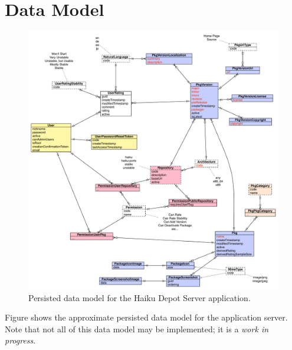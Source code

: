
\section{Data Model}

\begin{figure}
\centering
\vspace{.2in}
\includegraphics[width=6.5in]{img-datamodel.pdf}
\caption{Persisted data model for the Haiku Depot Server application.}
\label{\thefigure}
\end{figure}

Figure {\thefigure} shows the approximate persisted data model for the application server.  Note that not all of this data model may be implemented; it is a {\it work in progress}.